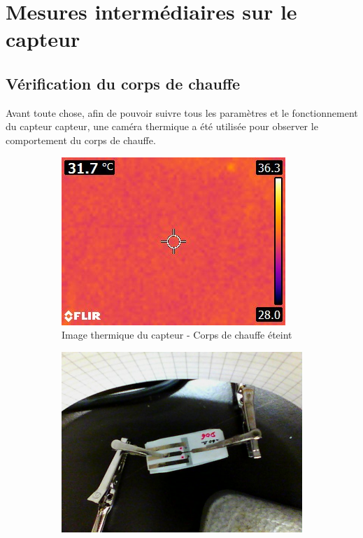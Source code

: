 \section{Mesures intermédiaires sur le capteur}
\label{chap:mesures}
\subsection{Vérification du corps de chauffe}
Avant toute chose, afin de pouvoir suivre tous les paramètres et le fonctionnement du capteur \gls{capteur}, une caméra thermique a été utilisée
pour observer le comportement du corps de chauffe.

\begin{figure}[H]
    \hspace{-0.3 cm}
    \begin{subfigure}{0.3\textwidth}
        \includegraphics[scale = 0.45]{assets/figures/thermique_sans_chauffe.jpg}
        \caption{Image thermique du capteur - Corps de chauffe éteint}
    \end{subfigure}
    \hspace{0.2cm}
    \begin{subfigure}{0.3\textwidth}
        \centering
        \includegraphics[scale = 0.23]{assets/figures/visuel_avec_chauffe.jpg}

\end{subfigure}
\end{figure}
